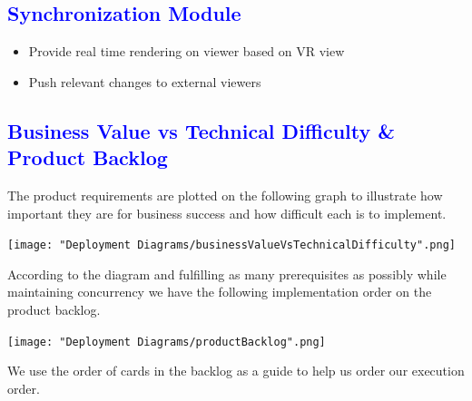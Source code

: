 \documentclass[12pt]{article}
\begin{document}
\begin{flushleft}
	\textcolor{blue}{\subsection{Synchronization Module}}	
	\begin{flushleft}
	\begin{itemize}
	\item Provide real time rendering on viewer based on VR view
	\item Push relevant changes to external viewers
	\end{itemize}	
	\end{flushleft}

\end{flushleft}

\textcolor{blue}{\section{Business Value vs Technical Difficulty \& Product Backlog}}
\begin{flushleft}
 	
 	The product requirements are plotted on the following graph to illustrate how important they are for business success and how difficult each is to implement.
	
	\texttt{[image: "Deployment Diagrams/businessValueVsTechnicalDifficulty".png]}
	
	According to the diagram and fulfilling as many prerequisites as possibly while maintaining concurrency we have the following implementation order on the product backlog.
	
	\texttt{[image: "Deployment Diagrams/productBacklog".png]}

\end{flushleft}

\begin{flushleft}

	We use the order of cards in the backlog as a guide to help us order our execution order.	
	
\end{flushleft}
\end{document}
